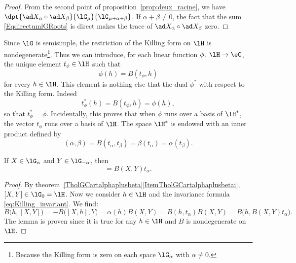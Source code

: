 \begin{proof}
    From the second point of proposition~\ref{prop:deux_racine}, we have $\dpt{\ad X_{\alpha}\circ\ad X_{\beta}}{\lG_{\mu}}{\lG_{\mu+\alpha+\beta}}$. If $\alpha+\beta\neq 0$, the fact that the sum \eqref{EqdirectumlGRoots} is direct makes the trace of $\ad X_{\alpha}\circ\ad X_{\beta}$ zero.
\end{proof}


Since \( \lG\) is semisimple, the restriction of the Killing form on \( \lH\) is nondegenerate\footnote{Because the Killing form is zero on each space \( \lG_{\alpha}\) with \( \alpha\neq 0\).}. Thus we can introduce, for each linear function $\phi\colon \lH\to \eC$, the unique element $t_{\phi}\in\lH$ such that
\begin{equation}
    \phi(h)=B(t_{\phi},h)
\end{equation}
for every $h\in\lH$.  This element is nothing else that the dual \( \phi^*\) with respect to the Killing form. Indeed
\begin{equation}
    t_{\phi}^*(h)=B(t_{\phi},h)=\phi(h),
\end{equation}
so that \( t_{\phi}^*=\phi\). Incidentally, this proves that when \( \phi\) runs over a basis of \( \lH^*\), the vector \( t_{\phi}\) runs over a basis of \( \lH\). The space $\lH^*$ is endowed with an inner product defined by
\begin{equation}        \label{EqDefInnprHestrar}
    (\alpha,\beta) = B(t_{\alpha},t_{\beta})=\beta(t_{\alpha})=\alpha(t_{\beta}).
\end{equation}

\begin{lemma}       \label{LemXYBXYtalpha}\label{Propoxalphaymoinaalpha}
    If \( X\in\lG_{\alpha}\) and \( Y\in\lG_{-\alpha}\), then
    \begin{equation}
        [X,Y]=B(X,Y)t_{\alpha}.
    \end{equation}
\end{lemma}

\begin{proof}
    By theorem~\ref{TholGCartalphaplusbeta}\ref{ItemTholGCartalphaplusbetai}, $[X,Y]\in\lG_0=\lH$. Now we consider $h\in\lH$ and the invariance formula \eqref{eq:Killing_invariant}. We find:
    \begin{equation}
        B\big( h,[X,Y] \big)=-B\big( [X,h],Y \big)=\alpha(h)B(X,Y)=B(h,t_{\alpha})B(X,Y)=B\big(h,B(X,Y)t_{\alpha}\big).
    \end{equation}
    The lemma is proven since it is true for any $h\in\lH$ and $B$ is nondegenerate on $\lH$.
\end{proof}

